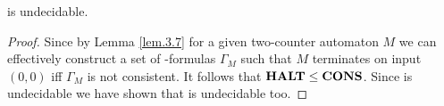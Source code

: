 \begin{theorem}\label{the.3.8}
	\PCons{} is undecidable.
\end{theorem}
\begin{proof}
	Since by Lemma \ref{lem.3.7} for a given two-counter automaton $M$ we can effectively construct a set of \SysP-formulas $\Gamma_M$ such that $M$ terminates on input $(0,0)$ iff $\Gamma_M$ is not consistent. It follows that $\textbf{HALT}\leq\textbf{CONS}$. Since \autHalt{} is undecidable we have shown that \PCons{} is undecidable too.
\end{proof}
